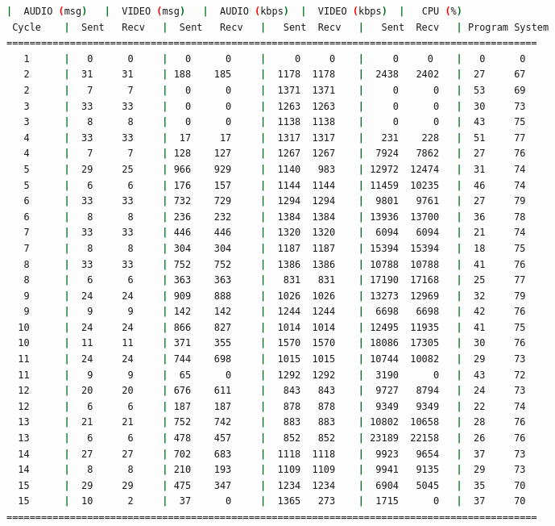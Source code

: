 \begin{adjustbox}{max width=\textwidth}
\begin{lstlisting}[language=bash,basicstyle=\ttfamily\scriptsize]
          |  AUDIO (msg)   |  VIDEO (msg)   |  AUDIO (kbps)  |  VIDEO (kbps)  |   CPU (%)
 Cycle    |  Sent   Recv   |  Sent   Recv   |   Sent  Recv   |   Sent  Recv   | Program System
============================================================================================
   1      |   0      0     |   0      0     |     0     0    |     0     0    |   0      0
   2      |  31     31     | 188    185     |  1178  1178    |  2438   2402   |  27     67
   2      |   7      7     |   0      0     |  1371  1371    |     0      0   |  53     69
   3      |  33     33     |   0      0     |  1263  1263    |     0      0   |  30     73
   3      |   8      8     |   0      0     |  1138  1138    |     0      0   |  43     75
   4      |  33     33     |  17     17     |  1317  1317    |   231    228   |  51     77
   4      |   7      7     | 128    127     |  1267  1267    |  7924   7862   |  27     76
   5      |  29     25     | 966    929     |  1140   983    | 12972  12474   |  31     74
   5      |   6      6     | 176    157     |  1144  1144    | 11459  10235   |  46     74
   6      |  33     33     | 732    729     |  1294  1294    |  9801   9761   |  27     79
   6      |   8      8     | 236    232     |  1384  1384    | 13936  13700   |  36     78
   7      |  33     33     | 446    446     |  1320  1320    |  6094   6094   |  21     74
   7      |   8      8     | 304    304     |  1187  1187    | 15394  15394   |  18     75
   8      |  33     33     | 752    752     |  1386  1386    | 10788  10788   |  41     76
   8      |   6      6     | 363    363     |   831   831    | 17190  17168   |  25     77
   9      |  24     24     | 909    888     |  1026  1026    | 13273  12969   |  32     79
   9      |   9      9     | 142    142     |  1244  1244    |  6698   6698   |  42     76
  10      |  24     24     | 866    827     |  1014  1014    | 12495  11935   |  41     75
  10      |  11     11     | 371    355     |  1570  1570    | 18086  17305   |  30     76
  11      |  24     24     | 744    698     |  1015  1015    | 10744  10082   |  29     73
  11      |   9      9     |  65      0     |  1292  1292    |  3190      0   |  43     72
  12      |  20     20     | 676    611     |   843   843    |  9727   8794   |  24     73
  12      |   6      6     | 187    187     |   878   878    |  9349   9349   |  22     74
  13      |  21     21     | 752    742     |   883   883    | 10802  10658   |  28     76
  13      |   6      6     | 478    457     |   852   852    | 23189  22158   |  26     76
  14      |  27     27     | 702    683     |  1118  1118    |  9923   9654   |  37     73
  14      |   8      8     | 210    193     |  1109  1109    |  9941   9135   |  29     73
  15      |  29     29     | 475    347     |  1234  1234    |  6904   5045   |  35     70
  15      |  10      2     |  37      0     |  1365   273    |  1715      0   |  37     70
============================================================================================
\end{lstlisting}
\end{adjustbox}

